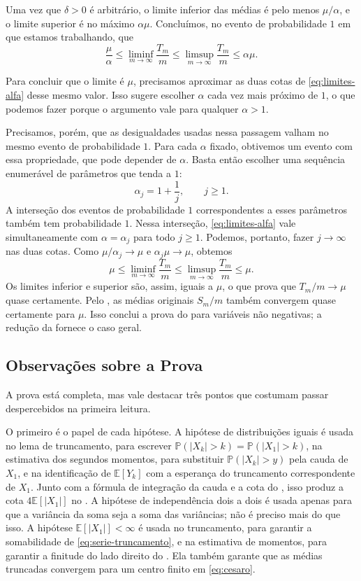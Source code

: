 \documentclass[12pt,portuguese]{article}
\theoremstyle{definition}
\theoremstyle{plainexercise}
\theoremstyle{starredexercise}
\theoremstyle{definition}
\begin{document}
Uma vez que $\delta>0$ é arbitrário, o limite inferior das médias é pelo
menos $\mu/\alpha$, e o limite superior é no máximo $\alpha\mu$. Concluímos,
no evento de probabilidade $1$ em que estamos trabalhando, que
\begin{equation}\label{eq:limites-alfa}
\frac{\mu}{\alpha}
\leqslant
\liminf_{m\to\infty}\frac{T_m}{m}
\leqslant
\limsup_{m\to\infty}\frac{T_m}{m}
\leqslant
\alpha\mu.
\end{equation}

Para concluir que o limite é $\mu$, precisamos aproximar as duas cotas de
\eqref{eq:limites-alfa} desse mesmo valor. Isso sugere escolher $\alpha$
cada vez mais próximo de $1$, o que podemos fazer porque o argumento vale
para qualquer $\alpha>1$.

Precisamos, porém, que as desigualdades usadas nessa passagem valham no
mesmo evento de probabilidade $1$. Para cada $\alpha$ fixado, obtivemos um
evento com essa propriedade, que pode depender de $\alpha$. Basta então
escolher uma sequência enumerável de parâmetros que tenda a $1$:
\[
\alpha_j=1+\frac{1}{j},\qquad j\geqslant1.
\]
A interseção dos eventos de probabilidade $1$ correspondentes a esses
parâmetros também tem probabilidade $1$. Nessa interseção,
\eqref{eq:limites-alfa} vale simultaneamente com $\alpha=\alpha_j$ para
todo $j\geqslant1$. Podemos, portanto, fazer $j\to\infty$ nas duas cotas.
Como $\mu/\alpha_j\to\mu$ e $\alpha_j\mu\to\mu$, obtemos
\[
\mu
\leqslant
\liminf_{m\to\infty}\frac{T_m}{m}
\leqslant
\limsup_{m\to\infty}\frac{T_m}{m}
\leqslant
\mu.
\]
Os limites inferior e superior são, assim, iguais a $\mu$, o que prova que
$T_m/m\to\mu$ quase certamente. Pelo , as médias
originais $S_m/m$ também convergem quase certamente para $\mu$. Isso conclui
a prova do  para variáveis não negativas; a redução da
 fornece o caso geral.

\subsection{Observações sobre a Prova}\label{subsec:observacoes-prova}

A prova está completa, mas vale destacar três pontos que costumam passar
despercebidos na primeira leitura.

O primeiro é o papel de cada hipótese. A hipótese de distribuições iguais é
usada no lema de truncamento, para escrever
$\mathbb{P}(|X_k|>k)=\mathbb{P}(|X_1|>k)$, na estimativa dos segundos
momentos, para substituir $\mathbb{P}(|X_k|>y)$ pela cauda de $X_1$, e na
identificação de $\mathbb{E}[Y_k]$ com a esperança do truncamento
correspondente de $X_1$. Junto com a fórmula de integração da cauda e a cota
do , isso produz a cota $4\mathbb{E}[|X_1|]$ no
. A hipótese de independência dois a dois é usada apenas
para que a variância da soma seja a soma das variâncias; não é preciso mais do
que isso. A hipótese
$\mathbb{E}[|X_1|]<\infty$ é usada no truncamento, para garantir a
somabilidade de \eqref{eq:serie-truncamento}, e na estimativa de momentos, para
garantir a finitude do lado direito do . Ela também garante
que as médias truncadas convergem para um centro finito em \eqref{eq:cesaro}.
\end{document}
